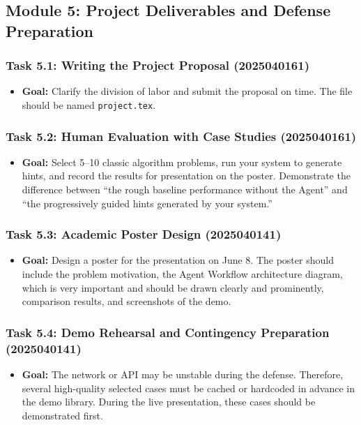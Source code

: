 \documentclass{article}
\begin{document}
\subsection*{Module 5: Project Deliverables and Defense Preparation}

\subsubsection*{Task 5.1: Writing the Project Proposal (2025040161)}

\begin{itemize}
    \item \textbf{Goal:} Clarify the division of labor and submit the proposal on time. The file should be named \texttt{project.tex}.
\end{itemize}

\subsubsection*{Task 5.2: Human Evaluation with Case Studies (2025040161)}

\begin{itemize}
    \item \textbf{Goal:} Select 5--10 classic algorithm problems, run your system to generate hints, and record the results for presentation on the poster. Demonstrate the difference between ``the rough baseline performance without the Agent'' and ``the progressively guided hints generated by your system.''
\end{itemize}

\subsubsection*{Task 5.3: Academic Poster Design (2025040141)}

\begin{itemize}
    \item \textbf{Goal:} Design a poster for the presentation on June 8. The poster should include the problem motivation, the Agent Workflow architecture diagram, which is very important and should be drawn clearly and prominently, comparison results, and screenshots of the demo.
\end{itemize}

\subsubsection*{Task 5.4: Demo Rehearsal and Contingency Preparation (2025040141)}

\begin{itemize}
    \item \textbf{Goal:} The network or API may be unstable during the defense. Therefore, several high-quality selected cases must be cached or hardcoded in advance in the demo library. During the live presentation, these cases should be demonstrated first.
\end{itemize}



\end{document}
